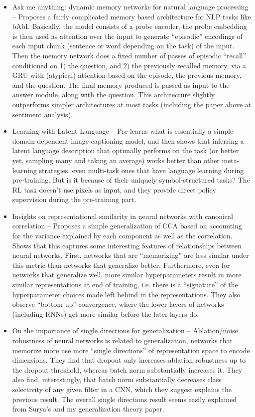 \documentclass[10pt]{article}
\begin{document}
\begin{itemize}
\item Ask me anything: dynamic memory networks for natural language processing -- Proposes a fairly complicated memory based architecture for NLP tasks like bAbI. Basically, the model consists of a probe encoder, the probe embedding is then used as attention over the input to generate ``episodic'' encodings of each input chunk (sentence or word depending on the task) of the input. Then the memory network does a fixed number of passes of episodic ``recall'' conditioned on 1) the question, and 2) the previously recalled memory, via a GRU with (atypical) attention based on the episode, the previous memory, and the question. The final memory produced is passed as input to the answer module, along with the question. This architecture slightly outperforms simpler architectures at most tasks (including the paper above at sentiment analysis). \citep{Kumar2015}
\item Learning with Latent Language -- Pre-learns what is essentially a simple domain-dependent image-captioning model, and then shows that inferring a latent language description that optimally performs on the task (or better yet, sampling many and taking an average) works better than other meta-learning strategies, even multi-task ones that have language learning during pre-training. But is it because of their uniquely symbol-structured tasks? The RL task doesn't use pixels as input, and they provide direct policy supervision during the pre-training part. \par 
\item Insights on representational similarity in neural networks with canonical correlation -- Proposes a simple generalization of CCA based on accounting for the variance explained by each component as well as the correlation. Shows that this captures some interesting features of relationships between neural networks. First, networks that are ``memorizing'' are less similar under this metric than networks that generalize better. Furthermore, even for networks that generalize well, more similar hyperparameters result in more similar representations at end of training, i.e. there is a ``signature'' of the hyperparameter choices made left behind in the representations. They also observe ``bottom-up'' convergence, where the lower layers of networks (including RNNs) get more similar before the later layers do.  
\item On the importance of single directions for generalization -- Ablation/noise robustness of neural networks is related to generalization, networks that memorize more use more ``single directions'' of representation space to encode dimensions. They find that dropout only increases ablation robustness up to the dropout threshold, whereas batch norm substantially increases it. They also find, interestingly, that batch norm substantially decreases class selectivity of any given filter in a CNN, which they suggest explains the previous result. The overall single directions result seems easily explained from Surya's and my generalization theory paper. \citep{Morcos2018}

\end{itemize}
\end{document}

